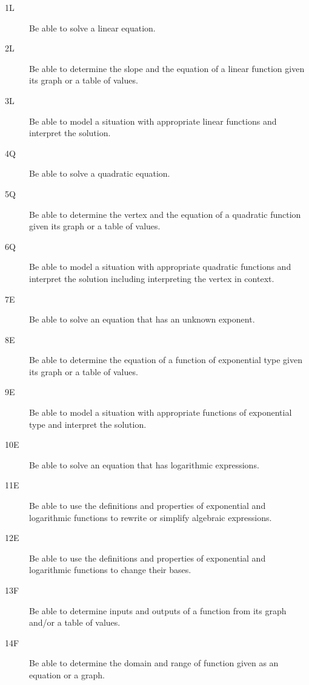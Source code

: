 \documentclass[10pt,]{article}
\theoremstyle{plain}
\theoremstyle{definition}
\numberwithin{equation}{section}
\begin{document}
\begin{description}
\item[{1L}]\hypertarget{li-1}{}\hypertarget{p-2}{}%
Be able to solve a linear equation.%
\item[{2L}]\hypertarget{li-2}{}\hypertarget{p-3}{}%
Be able to determine the slope and the equation of a linear function given its graph or a table of values.%
\item[{3L}]\hypertarget{li-3}{}\hypertarget{p-4}{}%
Be able to model a situation with appropriate linear functions and interpret the solution.%
\item[{4Q}]\hypertarget{li-4}{}\hypertarget{p-5}{}%
Be able to solve a quadratic equation.%
\item[{5Q}]\hypertarget{li-5}{}\hypertarget{p-6}{}%
Be able to determine the vertex and the equation of a quadratic function given its graph or a table of values.%
\item[{6Q}]\hypertarget{li-6}{}\hypertarget{p-7}{}%
Be able to model a situation with appropriate quadratic functions and interpret the solution including interpreting the vertex in context.%
\item[{7E}]\hypertarget{li-7}{}\hypertarget{p-8}{}%
Be able to solve an equation that has an unknown exponent.%
\item[{8E}]\hypertarget{li-8}{}\hypertarget{p-9}{}%
Be able to determine the equation of a function of exponential type given its graph or a table of values.%
\item[{9E}]\hypertarget{li-9}{}\hypertarget{p-10}{}%
Be able to model a situation with appropriate functions of exponential type and interpret the solution.%
\item[{10E}]\hypertarget{li-10}{}\hypertarget{p-11}{}%
Be able to solve an equation that has logarithmic expressions.%
\item[{11E}]\hypertarget{li-11}{}\hypertarget{p-12}{}%
Be able to use the definitions and properties of exponential and logarithmic functions to rewrite or simplify algebraic expressions.%
\item[{12E}]\hypertarget{li-12}{}\hypertarget{p-13}{}%
Be able to use the definitions and properties of exponential and logarithmic functions to change their bases.%
\item[{13F}]\hypertarget{li-13}{}\hypertarget{p-14}{}%
Be able to determine inputs and outputs of a function from its graph and/or a table of values.%
\item[{14F}]\hypertarget{li-14}{}\hypertarget{p-15}{}%
Be able to determine the domain and range of function given as an equation or a graph.%

\end{description}
\end{document}
